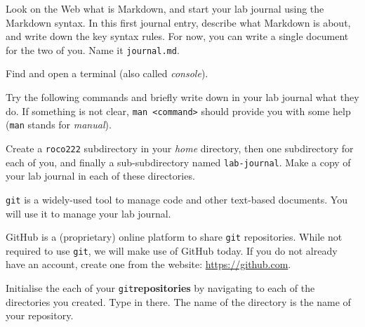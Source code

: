 \documentclass{instructions}
\newcommand{\git}{\texttt{git}\xspace}
\begin{document}
Look on the Web what is Markdown, and start your lab journal using the Markdown
syntax. In this first journal entry, describe what Markdown is about, and write
down the key syntax rules. For now, you can write a single document for the two
of you. Name it \texttt{journal.md}.



Find and open a terminal (also called \emph{console}).

Try the following commands and briefly write down in your lab journal what they do.
If something is not clear, \texttt{man <command>} should provide you with some
help (\texttt{man} stands for \emph{manual}).



Create a \texttt{roco222} subdirectory in your \emph{home} directory, then one
subdirectory for each of you, and finally a sub-subdirectory named
\texttt{lab-journal}. Make a copy of your lab journal in each of
these directories.



\git is a widely-used tool to manage code and other text-based documents. You
will use it to manage your lab journal.

GitHub is a (proprietary) online platform to share \git repositories. While not
required to use \git, we will make use of GitHub today. If you do not already
have an account, create one from the website: \url{https://github.com}.


Initialise the each of your \git \textbf{repositories} by navigating to each of
the directories you created. Type  in there. The name of the
directory is the name of your repository.
\end{document}

